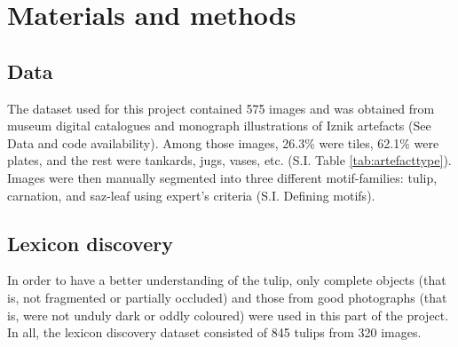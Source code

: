 \documentclass[11pt]{article}
\begin{document}
\section{Materials and methods}
\subsection{Data}
The dataset used for this project contained 575 images and was obtained from museum digital catalogues and monograph illustrations of Iznik artefacts (See Data and code availability). Among those images, 26.3\% were tiles, 62.1\% were plates, and the rest were tankards, jugs, vases, etc. (S.I. Table \ref{tab:artefacttype}). Images were then manually segmented into three different motif-families: tulip, carnation, and saz-leaf using expert's criteria (S.I. Defining motifs). 

\subsection{Lexicon discovery}
In order to have a better understanding of the tulip, only complete objects (that is, not fragmented or partially occluded) and those from good photographs (that is, were not unduly dark or oddly coloured) were used in this part of the project. In all, the lexicon discovery dataset consisted of 845 tulips from 320 images.
\end{document}
